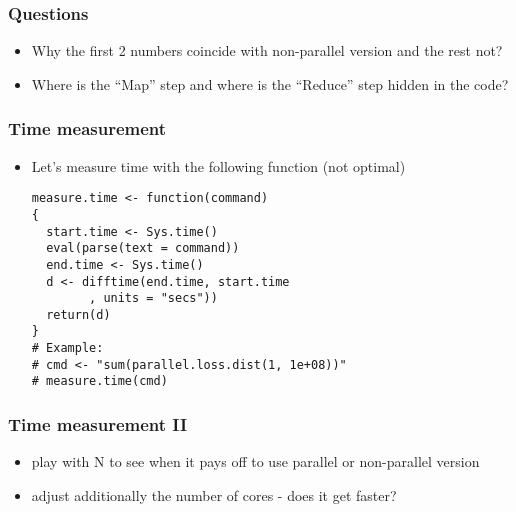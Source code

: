 \documentclass[bigger]{beamer}
\begin{document}
\begin{frame}
\frametitle{Questions}
\label{sec-3-15}
\begin{itemize}

\item Why the first 2 numbers coincide with non-parallel version and the rest not?
\label{sec-3-15-1}%

\item Where is the ``Map'' step and where is the ``Reduce'' step hidden in the code?
\label{sec-3-15-2}%
\end{itemize} %
\end{frame}
\begin{frame}[fragile]
\frametitle{Time measurement}
\label{sec-3-16}
\begin{itemize}

\item Let's measure time with the following function (not optimal)\\
\label{sec-3-16-1}%
\begin{verbatim}
measure.time <- function(command)
{
  start.time <- Sys.time()
  eval(parse(text = command))
  end.time <- Sys.time()
  d <- difftime(end.time, start.time
        , units = "secs"))
  return(d)
}
# Example:
# cmd <- "sum(parallel.loss.dist(1, 1e+08))"
# measure.time(cmd)
\end{verbatim}


\end{itemize} %
\end{frame}
\begin{frame}
\frametitle{Time measurement II}
\label{sec-3-17}
\begin{itemize}

\item play with N to see when it pays off to use parallel or non-parallel version
\label{sec-3-17-1}%

\item adjust additionally the number of cores - does it get faster?
\label{sec-3-17-2}%
\end{itemize} %
\end{frame}
\end{document}
